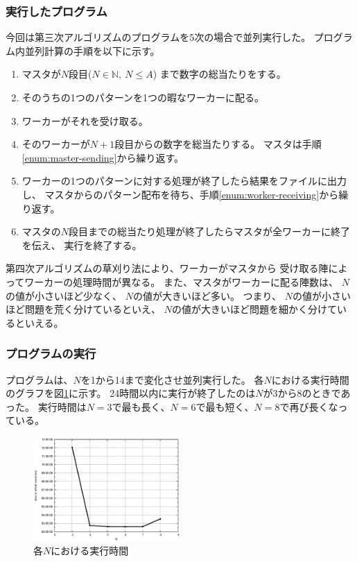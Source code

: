 \subsubsection{実行したプログラム}
今回は第三次アルゴリズムのプログラムを5次の場合で並列実行した。
プログラム内並列計算の手順を以下に示す。
\begin{enumerate}
\item マスタが$N$段目($N \in \mathbb{N}, \ N \leq A$)
	まで数字の総当たりをする。
\item そのうちの1つのパターンを1つの暇なワーカーに配る。 \label{enum:master-sending}
\item ワーカーがそれを受け取る。 \label{enum:worker-receiving}
\item そのワーカーが$N+1$段目からの数字を総当たりする。
	マスタは手順\ref{enum:master-sending}から繰り返す。
\item ワーカーの1つのパターンに対する処理が終了したら結果をファイルに出力し、
	マスタからのパターン配布を待ち、手順\ref{enum:worker-receiving}から繰り返す。
\item マスタの$N$段目までの総当たり処理が終了したらマスタが全ワーカーに終了を伝え、
実行を終了する。
\end{enumerate}

第四次アルゴリズムの草刈り法により、ワーカーがマスタから
受け取る陣によってワーカーの処理時間が異なる。
また、マスタがワーカーに配る陣数は、
$N$の値が小さいほど少なく、
$N$の値が大きいほど多い。
つまり、
$N$の値が小さいほど問題を荒く分けているといえ、
$N$の値が大きいほど問題を細かく分けているといえる。


\subsubsection{プログラムの実行}
プログラムは、$N$を1から14まで変化させ並列実行した。
各$N$における実行時間のグラフを図\ref{pic:allN-time}に示す。
24時間以内に実行が終了したのは$N$が3から8のときであった。
実行時間は$N=3$で最も長く、$N=6$で最も短く、$N=8$で再び長くなっている。

\begin{figure}[!htb]
	\begin{center}
\includegraphics[width=0.5\textwidth]{exp3-result.eps}
	\end{center}
	\caption{各$N$における実行時間}
	\label{pic:allN-time}
\end{figure}


